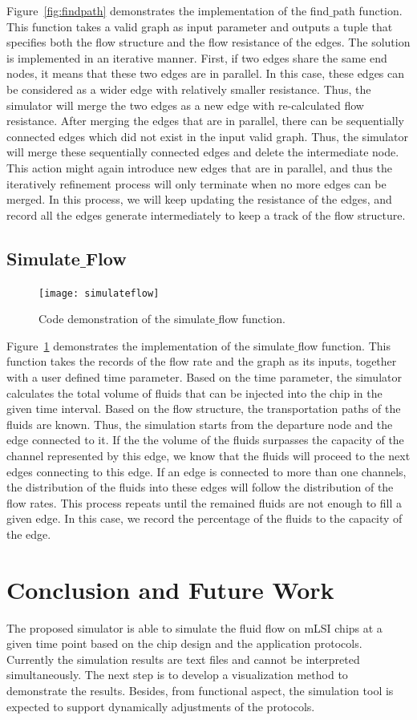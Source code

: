 \documentclass{article}
\begin{document}
Figure~\ref{fig:findpath} demonstrates the implementation of the find$\_$path function. This function takes a valid graph as input parameter and outputs a tuple that specifies both the flow structure and the flow resistance of the edges.
The solution is implemented in an iterative manner. First, if two edges share the same end nodes, it means that these two edges are in parallel.
In this case, these edges can be considered as a wider edge with relatively smaller resistance.
Thus, the simulator will merge the two edges as a new edge with re-calculated flow resistance.
After merging the edges that are in parallel, there can be sequentially connected edges which did not exist in the input valid graph.
Thus,
the simulator will merge these sequentially connected edges and delete the intermediate node.
This action might again introduce new edges that are in parallel,
and thus the iteratively refinement process will only terminate when no more edges can be merged.
In this process, we will keep updating the resistance of the edges, and record all the edges generate intermediately to keep a track of the flow structure.

\subsection{Simulate$\_$Flow}

\begin{figure}
\caption{Code demonstration of the simulate$\_$flow function.}
\texttt{[image: simulateflow]}
\label{fig:simulateflow}
\end{figure}

Figure~\ref{fig:simulateflow} demonstrates the implementation of the simulate$\_$flow function.
This function takes the records of the flow rate and the graph as its inputs, together with a user defined time parameter.
Based on the time parameter, the simulator calculates the total volume of fluids that can be injected into the chip in the given time interval.
Based on the flow structure, the transportation paths of the fluids are known.
Thus, the simulation starts from the departure node and the edge connected to it.
If the the volume of the fluids surpasses the capacity of the channel represented by this edge,
we know that the fluids will proceed to the next edges connecting to this edge.
If an edge is connected to more than one channels,
the distribution of the fluids into these edges will follow the distribution of the flow rates.
This process repeats until the remained fluids are not enough to fill a given edge.
In this case,
we record the percentage of the fluids to the capacity of the edge. 

\section{Conclusion and Future Work}

The proposed simulator is able to simulate the fluid flow on mLSI chips at a given time point based on the chip design and the application protocols. Currently the simulation results are text files and cannot be interpreted simultaneously. The next step is to develop a visualization method to demonstrate the results. Besides, from functional aspect, the simulation tool is expected to support dynamically adjustments of the protocols.
\end{document}
